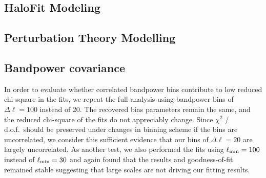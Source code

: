 \subsection{HaloFit Modeling}\label{sec:results/halofit}


\subsection{Perturbation Theory Modelling}\label{sec:results/lpt}


\subsection{Bandpower covariance}\label{sec:results/discussion}

In order to evaluate whether correlated bandpower bins contribute to low reduced chi-square in the fits, we repeat the full analysis using bandpower bins of $\Delta \ell = 100$ instead of 20. The recovered bias parameters remain the same, and the reduced chi-square of the fits do not appreciably change. Since $\chi^2$ / d.o.f.\ should be preserved under changes in binning scheme if the bins are uncorrelated, we consider this sufficient evidence that our bins of $\Delta \ell = 20$ are largely uncorrelated. As another test, we also performed the fits using $\ell_{\rm min} = 100$ instead of $\ell_{\rm min} = 30$ and again found that the results and goodness-of-fit remained stable suggesting that large scales are not driving our fitting results.

%
